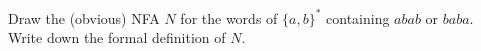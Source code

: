 Draw the (obvious) NFA $N$ for the words of $\{a,b\}^*$ containing $abab$
or $baba$.
Write down the formal definition of $N$.
